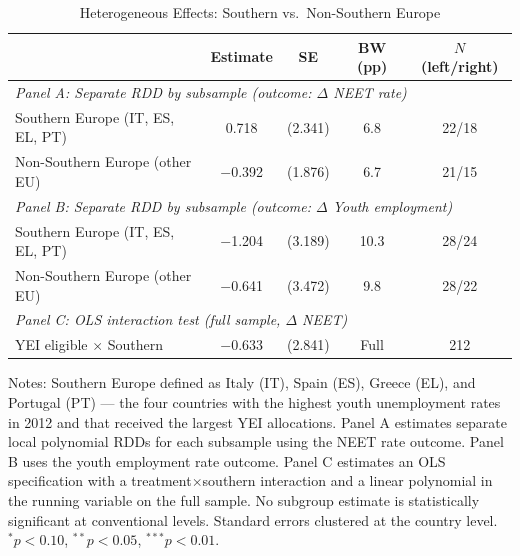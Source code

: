 \begin{table}[h!]
\centering
\caption{Heterogeneous Effects: Southern vs.\ Non-Southern Europe}
\label{tab:hetero}
\begin{tabular}{lcccc}
\toprule
 & Estimate & SE & BW (pp) & $N$ (left/right) \\
\midrule
\multicolumn{5}{l}{\textit{Panel A: Separate RDD by subsample (outcome: $\Delta$ NEET rate)}} \\
Southern Europe (IT, ES, EL, PT) & 0.718 & (2.341) & 6.8 & 22/18 \\
Non-Southern Europe (other EU) & $-$0.392 & (1.876) & 6.7 & 21/15 \\
\midrule
\multicolumn{5}{l}{\textit{Panel B: Separate RDD by subsample (outcome: $\Delta$ Youth employment)}} \\
Southern Europe (IT, ES, EL, PT) & $-$1.204 & (3.189) & 10.3 & 28/24 \\
Non-Southern Europe (other EU) & $-$0.641 & (3.472) & 9.8 & 28/22 \\
\midrule
\multicolumn{5}{l}{\textit{Panel C: OLS interaction test (full sample, $\Delta$ NEET)}} \\
YEI eligible $\times$ Southern & $-$0.633 & (2.841) & Full & 212 \\
\bottomrule
\end{tabular}

\raggedright\footnotesize
Notes: Southern Europe defined as Italy (IT), Spain (ES), Greece (EL), and Portugal (PT) --- the four countries with the highest youth unemployment rates in 2012 and that received the largest YEI allocations. Panel A estimates separate local polynomial RDDs for each subsample using the NEET rate outcome. Panel B uses the youth employment rate outcome. Panel C estimates an OLS specification with a treatment$\times$southern interaction and a linear polynomial in the running variable on the full sample. No subgroup estimate is statistically significant at conventional levels. Standard errors clustered at the country level. $^{*}p<0.10$, $^{**}p<0.05$, $^{***}p<0.01$.
\end{table}
